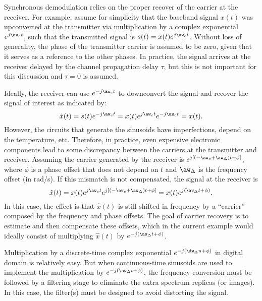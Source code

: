 Synchronous demodulation relies on the proper recover of the carrier at the receiver. 
For example, assume for simplicity that the baseband signal $x(t)$ was upconverted at the transmitter via multiplication by a complex exponential $e^{j \aw_c t}$, such that the transmitted signal is $s(t) = x(t) e^{j \aw_c t}$. Without loss of generality, the phase of the transmitter carrier is assumed to be zero, given that it serves as a reference to the other phases. In practice, the signal arrives at the receiver delayed by the channel propagation delay $\tau$, but this is not important for this discussion and $\tau=0$ is assumed. 

Ideally, the receiver can use $e^{-j \aw_c t}$ to downconvert the signal and recover the signal of interest as indicated by:
\[
\hat x(t) = s(t) e^{-j \aw_c t} = x(t) e^{j \aw_c t} e^{-j \aw_c t} = x(t).
\]
However, the circuits that generate the sinusoids have imperfections, depend on the temperature, etc. Therefore, in practice, even expensive electronic components lead to some discrepancy between the carriers at the transmitter and receiver. Assuming the carrier generated by the receiver is $e^{j[(- \aw_c + \aw_{\Delta}) t + \phi]}$, where $\phi$ is a phase offset that does not depend on $t$ and $\aw_{\Delta}$ is the frequency offset (in rad/s). If this mismatch is not compensated, the signal at the receiver is
\begin{equation}
\hat x(t) = x(t) e^{j \aw_c t} e^{j[(- \aw_c + \aw_{\Delta}) t + \phi]} = x(t) e^{j(\aw_{\Delta} t + \phi)}.
\label{eq:offsets_freq_phase}
\end{equation}
In this case, the effect is that $\hat x(t)$ is still shifted in frequency by a ``carrier'' composed by the frequency and phase offsets. The goal of carrier recovery is to estimate and then compensate these offsets, which in the current example would ideally consist of multiplying $\hat x(t)$ by $e^{-j(\aw_{\Delta} t + \phi)}$.

Multiplication by a discrete-time complex exponential $e^{-j(\dw_{\Delta} n + \phi)}$ in digital domain is relatively easy. But when continuous-time sinusoids are used to implement the multiplication by $e^{-j(\aw_{\Delta} t + \phi)}$, the frequency-conversion must be followed by a filtering stage to eliminate the extra spectrum replicas (or images). In this case, the filter(s) must be designed to avoid distorting the signal.

